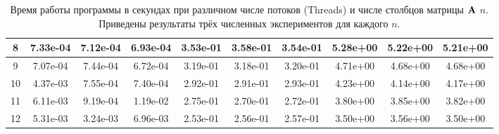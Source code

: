 \documentclass[12pt]{article}
\begin{document}
\begin{table}[htbp]
\begin{adjustbox}{angle=90}
\begin{tabular}{|c|ccc|ccc|ccc|}
8 & \multicolumn{1}{c|}{7.33e-04} & \multicolumn{1}{c|}{7.12e-04} & 6.93e-04 & \multicolumn{1}{c|}{3.53e-01} & \multicolumn{1}{c|}{3.58e-01} & 3.54e-01 & \multicolumn{1}{c|}{5.28e+00} & \multicolumn{1}{c|}{5.22e+00} & 5.21e+00 \\ \hline
9 & \multicolumn{1}{c|}{7.07e-04} & \multicolumn{1}{c|}{7.44e-04} & 6.72e-04 & \multicolumn{1}{c|}{3.19e-01} & \multicolumn{1}{c|}{3.18e-01} & 3.20e-01 & \multicolumn{1}{c|}{4.71e+00} & \multicolumn{1}{c|}{4.68e+00} & 4.68e+00 \\ \hline
10 & \multicolumn{1}{c|}{4.37e-03} & \multicolumn{1}{c|}{7.55e-04} & 7.40e-04 & \multicolumn{1}{c|}{2.92e-01} & \multicolumn{1}{c|}{2.91e-01} & 2.93e-01 & \multicolumn{1}{c|}{4.23e+00} & \multicolumn{1}{c|}{4.14e+00} & 4.17e+00 \\ \hline
11 & \multicolumn{1}{c|}{6.11e-03} & \multicolumn{1}{c|}{9.19e-04} & 1.19e-02 & \multicolumn{1}{c|}{2.75e-01} & \multicolumn{1}{c|}{2.70e-01} & 2.72e-01 & \multicolumn{1}{c|}{3.80e+00} & \multicolumn{1}{c|}{3.85e+00} & 3.82e+00 \\ \hline
12 & \multicolumn{1}{c|}{5.31e-03} & \multicolumn{1}{c|}{3.24e-03} & 6.96e-03 & \multicolumn{1}{c|}{2.53e-01} & \multicolumn{1}{c|}{2.56e-01} & 2.57e-01 & \multicolumn{1}{c|}{3.50e+00} & \multicolumn{1}{c|}{3.56e+00} & 3.50e+00 \\ \hline
\end{tabular}
\end{adjustbox}
\caption{Время работы программы в секундах при различном числе потоков (Threads) и числе столбцов матрицы $\vb{A}$ $n$. Приведены результаты трёх численных экспериментов для каждого $n$.}
\label{tab:2}
\end{table}
\end{document}
